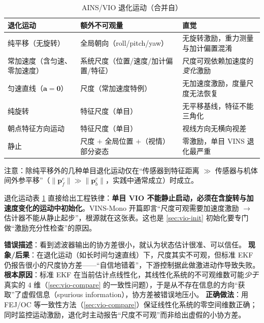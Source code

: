 \begin{table}[H]\centering\small
\caption{AINS/VIO 退化运动（合并自\cite{carlone2026handbook,huang2019vins,martinelli2014closed}）}
\label{tab:vio-degenerate}
\begin{tabular}{lll}
\toprule
退化运动 & 额外不可观量 & 直觉 \\
\midrule
纯平移（无旋转） & 全局朝向（roll/pitch/yaw） & 无旋转激励，重力测量与加计偏置混淆 \\
常加速度（含匀速、零加速度） & 系统尺度（位置/速度/加计偏置/特征） & 尺度可观依赖加速度的\emph{变化}激励 \\
匀速直线（$\mathbf{a}=\mathbf{0}$） & 尺度（常加速度特例） & 无加速度激励，度量尺度无法恢复 \\
纯旋转 & 特征尺度（单目） & 无平移基线，特征不能三角化 \\
朝点特征方向运动 & 特征尺度（单目） & 视线方向无横向视差 \\
静止 & 尺度 $+$ 全局位置 $+$（视情）部分姿态 & 零激励，单目 VINS 退化最严重 \\
\bottomrule
\end{tabular}
\end{table}

\noindent 注意：除纯平移外的几种单目退化运动仅在“传感器到特征距离 $\gg$ 传感器与机体间外参平移”（$\|\mathbf{p}_f^c\|\gg\|\mathbf{p}_b^c\|$，实践中通常成立）时成立。

\begin{insight}
退化运动表 \cref{tab:vio-degenerate} 直接给出工程铁律：\textbf{单目 VIO 不能静止启动，必须在含旋转与加速度变化的运动中初始化}。VINS-Mono\cite{qin2018vins} 开篇即言“尺度可观需要加速度激励 $\to$ 估计器不能从静止起步”，根源就在这张表。这也是 \cref{sec:vio-init} 初始化要专门做“激励充分性检查”的原因。
\end{insight}

\begin{pitfall}
\textbf{错误描述}：看到滤波器输出的协方差很小，就认为状态估计很准、可以信任。
\textbf{现象/后果}：在退化运动（如长时间匀速直线）下，尺度其实不可观，但标准 EKF 仍报告很小的尺度协方差——“自信地错着”，下游控制据此做激进动作导致失败。
\textbf{根本原因}：标准 EKF 在当前估计点线性化，其线性化系统的不可观维数可能\emph{少于}真实的 $4$ 维（\cref{sec:vio-compare} 的一致性问题），于是从不存在信息的方向“获取”了虚假信息（spurious information），协方差被错误地压小。
\textbf{正确做法}：用 FEJ/OC 等一致性方法（\cref{sec:vio-compare}）保证线性化系统的零空间维数正确；同时监控运动激励，退化时主动报告“尺度不可观”而非给出虚假的小协方差。
\end{pitfall}

